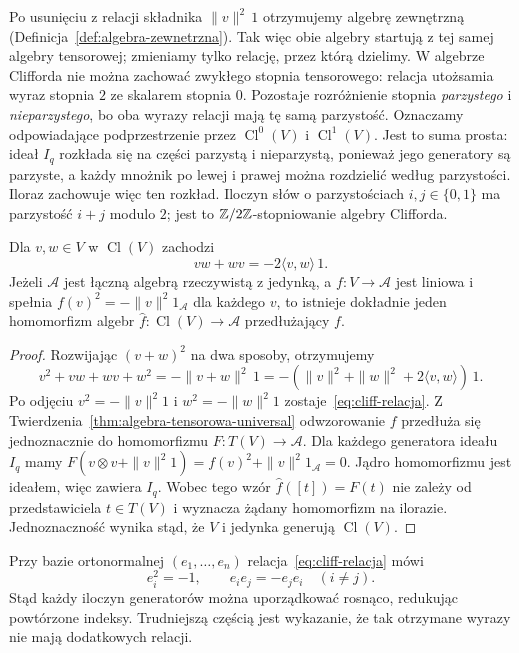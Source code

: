 Po usunięciu z relacji składnika $\|v\|^2\,1$
otrzymujemy algebrę zewnętrzną
(Definicja~\ref{def:algebra-zewnetrzna}).
Tak więc obie algebry startują z tej samej algebry
tensorowej; zmieniamy tylko relację, przez którą
dzielimy. W algebrze Clifforda nie można zachować
zwykłego stopnia tensorowego: relacja utożsamia
wyraz stopnia $2$ ze skalarem stopnia $0$.
Pozostaje rozróżnienie stopnia \emph{parzystego}
i \emph{nieparzystego}, bo oba wyrazy relacji
mają tę samą parzystość.
Oznaczamy odpowiadające podprzestrzenie przez
$\operatorname{Cl}^0(V)$ i $\operatorname{Cl}^1(V)$.
Jest to suma prosta: ideał $I_q$ rozkłada się na części
parzystą i nieparzystą, ponieważ jego generatory są parzyste,
a każdy mnożnik po lewej i prawej można rozdzielić
według parzystości. Iloraz zachowuje więc ten rozkład.
Iloczyn słów o parzystościach $i,j\in\{0,1\}$
ma parzystość $i+j$ modulo $2$; jest to
$\mathbb{Z}/2\mathbb{Z}$-stopniowanie algebry Clifforda.

\begin{twierdzenie}
\label{thm:cliff-relacje}
Dla $v,w\in V$ w $\operatorname{Cl}(V)$ zachodzi
\begin{equation}\label{eq:cliff-relacja}
 vw+wv=-2\langle v,w\rangle\,1.
\end{equation}
Jeżeli $\mathcal A$ jest łączną algebrą rzeczywistą
z jedynką, a $f:V\to\mathcal A$ jest liniowa i spełnia
$f(v)^2=-\|v\|^2 1_{\mathcal A}$ dla każdego $v$,
to istnieje dokładnie jeden homomorfizm algebr
$\widehat f:\operatorname{Cl}(V)\to\mathcal A$
przedłużający $f$.
\end{twierdzenie}
\begin{proof}
Rozwijając $(v+w)^2$ na dwa sposoby, otrzymujemy
\[
 v^2+vw+wv+w^2=-\|v+w\|^2\,1
  =-(\|v\|^2+\|w\|^2+2\langle v,w\rangle)\,1.
\]
Po odjęciu $v^2=-\|v\|^2 1$ i
$w^2=-\|w\|^2 1$ zostaje~\eqref{eq:cliff-relacja}.
Z Twierdzenia~\ref{thm:algebra-tensorowa-universal}
odwzorowanie $f$ przedłuża się jednoznacznie do homomorfizmu
$F:T(V)\to\mathcal A$. Dla każdego generatora ideału
$I_q$ mamy
$F(v\otimes v+\|v\|^2 1)
 =f(v)^2+\|v\|^2 1_{\mathcal A}=0$.
Jądro homomorfizmu jest ideałem, więc zawiera $I_q$.
Wobec tego wzór $\widehat f([t])=F(t)$
nie zależy od przedstawiciela $t\in T(V)$
i wyznacza żądany homomorfizm na ilorazie.
Jednoznaczność wynika stąd, że $V$ i jedynka
generują $\operatorname{Cl}(V)$.
\end{proof}

Przy bazie ortonormalnej $(e_1,\ldots,e_n)$
relacja~\eqref{eq:cliff-relacja} mówi
\begin{equation}\label{eq:cliff-orto}
 e_i^2=-1,\qquad e_ie_j=-e_je_i\quad(i\ne j).
\end{equation}
Stąd każdy iloczyn generatorów można uporządkować
rosnąco, redukując powtórzone indeksy.
Trudniejszą częścią jest wykazanie, że tak otrzymane
wyrazy nie mają dodatkowych relacji.

